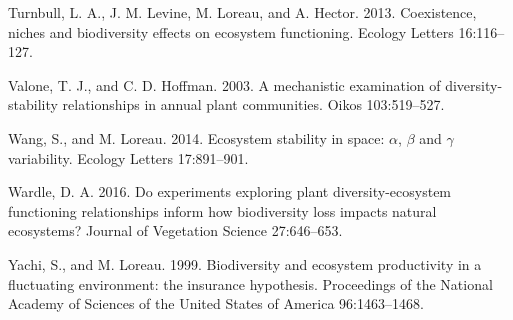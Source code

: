 \documentclass[12pt,]{article}
\begin{document}
Turnbull, L. A., J. M. Levine, M. Loreau, and A. Hector. 2013.
Coexistence, niches and biodiversity effects on ecosystem functioning.
Ecology Letters 16:116--127.

Valone, T. J., and C. D. Hoffman. 2003. A mechanistic examination of
diversity-stability relationships in annual plant communities. Oikos
103:519--527.

Wang, S., and M. Loreau. 2014. Ecosystem stability in space: \(\alpha\),
\(\beta\) and \(\gamma\) variability. Ecology Letters 17:891--901.

Wardle, D. A. 2016. Do experiments exploring plant diversity-ecosystem
functioning relationships inform how biodiversity loss impacts natural
ecosystems? Journal of Vegetation Science 27:646--653.

Yachi, S., and M. Loreau. 1999. Biodiversity and ecosystem productivity
in a fluctuating environment: the insurance hypothesis. Proceedings of
the National Academy of Sciences of the United States of America
96:1463--1468.
\end{document}
